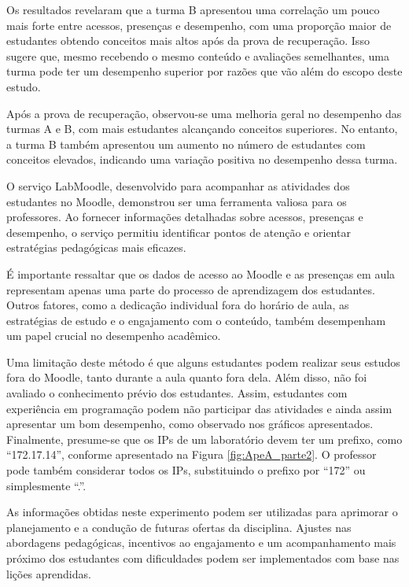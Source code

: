 Os resultados revelaram que a turma B apresentou uma correlação um pouco mais forte entre acessos, presenças e desempenho, com uma proporção maior de estudantes obtendo conceitos mais altos após da prova de recuperação. Isso sugere que, mesmo recebendo o mesmo conteúdo e avaliações semelhantes, uma turma pode ter um desempenho superior por razões que vão além do escopo deste estudo.

Após a prova de recuperação, observou-se uma melhoria geral no desempenho das turmas A e B, com mais estudantes alcançando conceitos superiores. No entanto, a turma B também apresentou um aumento no número de estudantes com conceitos elevados, indicando uma variação positiva no desempenho dessa turma.

O serviço LabMoodle, desenvolvido para acompanhar as atividades dos estudantes no Moodle, demonstrou ser uma ferramenta valiosa para os professores. Ao fornecer informações detalhadas sobre acessos, presenças e desempenho, o serviço permitiu identificar pontos de atenção e orientar estratégias pedagógicas mais eficazes.

É importante ressaltar que os dados de acesso ao Moodle e as presenças em aula representam apenas uma parte do processo de aprendizagem dos estudantes. Outros fatores, como a dedicação individual fora do horário de aula, as estratégias de estudo e o engajamento com o conteúdo, também desempenham um papel crucial no desempenho acadêmico.

Uma limitação deste método é que alguns estudantes podem realizar seus estudos fora do Moodle, tanto durante a aula quanto fora dela. Além disso, não foi avaliado o conhecimento prévio dos estudantes. Assim, estudantes com experiência em programação podem não participar das atividades e ainda assim apresentar um bom desempenho, como observado nos gráficos apresentados. Finalmente, presume-se que os IPs de um laboratório devem ter um prefixo, como ``172.17.14'', conforme apresentado na Figura \ref{fig:ApeA_parte2}. O professor pode também considerar todos os IPs, substituindo o prefixo por ``172'' ou simplesmente ``.''.

As informações obtidas neste experimento podem ser utilizadas para aprimorar o planejamento e a condução de futuras ofertas da disciplina. Ajustes nas abordagens pedagógicas, incentivos ao engajamento e um acompanhamento mais próximo dos estudantes com dificuldades podem ser implementados com base nas lições aprendidas.
